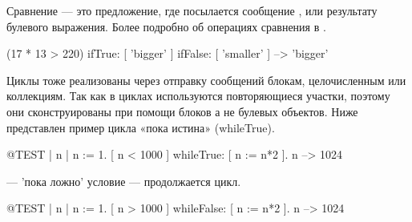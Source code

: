 \documentclass[a4paper,10pt,twoside]{book}
\begin{document}
Сравнение --- это предложение, где посылается сообщение ,
 или  результату булевого выражения.
Более подробно об операциях сравнения в .

\begin{code}{}
(17 * 13 > 220)
   ifTrue: [ 'bigger' ]
   ifFalse: [ 'smaller' ] --> 'bigger'
\end{code}


Циклы тоже реализованы через отправку сообщений блокам, целочисленным или коллекциям.
Так как в циклах используются повторяющиеся участки, поэтому они сконструированы при помощи блоков а не булевых объектов.
Ниже представлен пример цикла «пока истина» (whileTrue).

\begin{code}{@TEST | n |}
n := 1.
[ n < 1000 ] whileTrue: [ n := n*2 ].
n --> 1024
\end{code}

\noindent

 --- 'пока ложно' условие --- продолжается цикл.

\begin{code}{@TEST | n |}
n := 1.
[ n > 1000 ] whileFalse: [ n := n*2 ].
n --> 1024
\end{code}

\noindent
\end{document}
